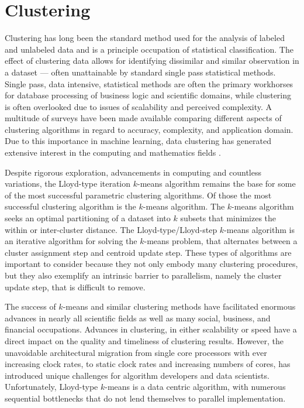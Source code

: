 \section{Clustering}

Clustering has long been the standard method used for the analysis of labeled and unlabeled data and is a principle
occupation of statistical classification.  The effect of clustering data allows for identifying dissimilar and similar
observation in a dataset --- often unattainable by standard single pass statistical methods.  Single pass, data
intensive, statistical methods are often the primary workhorses for database processing of business logic and scientific
domains, while clustering is often overlooked due to issues of scalability \cite{clusters} and perceived complexity.  A
multitude of surveys \cite{clusters} have been made available comparing different aspects of clustering algorithms in
regard to accuracy, complexity, and application domain.  Due to this importance in machine learning, data clustering has
generated extensive interest in the computing and mathematics fields
\cite{anderberg1973,Samet,clusters,latent1,Hofmann,clusterstats,Zass2005}.  

Despite rigorous exploration, advancements in computing and countless variations, the Lloyd-type iteration $k$-means 
algorithm \cite{Hartigan, macqueen-67} remains the base for some of the most successful parametric clustering 
algorithms\cite{arthur-07}.  Of those the most successful clustering algorithm is the $k$-means algorithm. The $k$-means
algorithm seeks an optimal partitioning of a dataset into $k$ subsets that minimizes the within or inter-cluster distance.
The Lloyd-type/Lloyd-step $k$-means algorithm is an iterative algorithm for solving the $k$-means problem, that alternates 
between a cluster assignment step and centroid update step. These types of algorithms are important to consider because 
they not only embody many clustering procedures, but they also exemplify an intrinsic barrier to parallelism, namely the 
cluster update step, that is difficult to remove.

The success of $k$-means and similar clustering methods have facilitated enormous advances in nearly all scientific fields
as well as many social, business, and financial occupations.  Advances in clustering, in either scalability or speed
have a direct impact on the quality and timeliness of clustering results.  However, the unavoidable architectural
migration from single core processors with ever increasing clock rates, to static clock rates and increasing numbers of
cores, has introduced unique challenges for algorithm developers and data scientists.  Unfortunately, Lloyd-type
$k$-means is a data centric algorithm, with numerous sequential bottlenecks that do not lend themselves to parallel
implementation.


